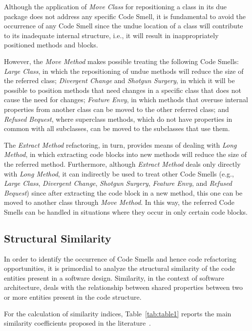 \documentclass[smallextended,natbib]{svjour3}
\begin{document}
{Although the application of \textit{Move Class} for repositioning a class in its due package does not address any specific Code Smell, it is fundamental to avoid the occurrence of any Code Smell since the undue location of a class will contribute to its inadequate internal structure, i.e., it will result in inappropriately positioned methods and blocks.

However, the \textit{Move Method} makes possible treating the following Code Smells: \textit{Large Class}, in which the repositioning of undue methods will reduce the size of the referred class; \textit{Divergent Change} and \textit{Shotgun Surgery}, in which it will be possible to position methods that need changes in a specific class that does not cause the need for changes; \textit{Feature Envy}, in which methods that overuse internal properties from another class can be moved to the other referred class; and \textit{Refused Bequest}, where superclass methods, which do not have properties in common with all subclasses, can be moved to the subclasses that use them.

The \textit{Extract Method} refactoring, in turn, provides means of dealing with \textit{Long Method}, in which extracting code blocks into new methods will reduce the size of the referred method. Furthermore, although \textit{Extract Method} deals only directly with \textit{Long Method}, it can indirectly be used to treat other Code Smells (e.g., \textit{Large Class}, \textit{Divergent Change}, \textit{Shotgun Surgery}, \textit{Feature Envy}, and \textit{Refused Bequest}) since after extracting the code block in a new method, this one can be moved to another class through \textit{Move Method}. In this way, the referred Code Smells can be handled in situations where they occur in only certain code blocks.

\subsection{Structural Similarity}
\label{sec:similaridade}
In order to identify the occurrence of Code Smells and hence code refactoring opportunities, it is primordial to analyze the structural similarity of the code entities present in a software design. Similarity, in the context of software architecture, deals with the relationship between shared properties between two or more entities present in the code structure.

For the calculation of similarity indices, %
Table~\ref{tab:table1} reports the main similarity coefficients proposed in the literature~\citep{2013_seke}.\\[-0.7cm]

}
\end{document}
